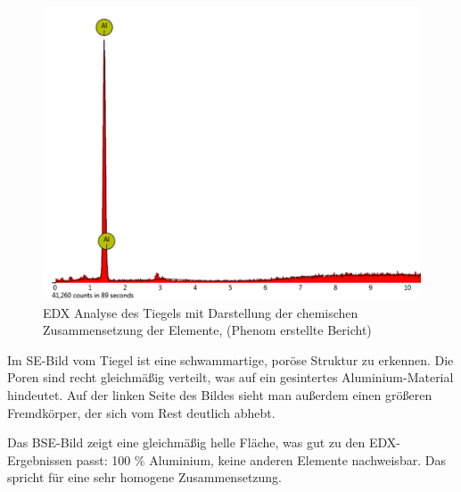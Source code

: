 \begin{figure}[H]
\begin{minipage}{.5\textwidth}
          \label{REM-Aufnahme(SE Komposit, 4000x) des Tiegels mit Punktanalyse}
        \end{minipage}
        
        \end{figure}
        \begin{figure}[H]
            \centering
            \includegraphics[scale=0.95]{Bilder/tiegel}
            \caption{EDX Analyse des Tiegels mit Darstellung der chemischen Zusammensetzung der Elemente, (Phenom erstellte Bericht)}
            
            \vspace{0.2cm}
            \label{Abb.2: EDX Analyse des Tiegels}
        \end{figure}
        Im SE-Bild vom Tiegel ist eine schwammartige, poröse Struktur zu erkennen. Die Poren sind recht gleichmäßig verteilt, was auf ein gesintertes Aluminium-Material hindeutet. Auf der linken Seite des Bildes sieht man außerdem einen größeren Fremdkörper, der sich vom Rest deutlich abhebt.

Das BSE-Bild zeigt eine gleichmäßig helle Fläche, was gut zu den EDX-Ergebnissen passt: 100 \% Aluminium, keine anderen Elemente nachweisbar. Das spricht für eine sehr homogene Zusammensetzung.
